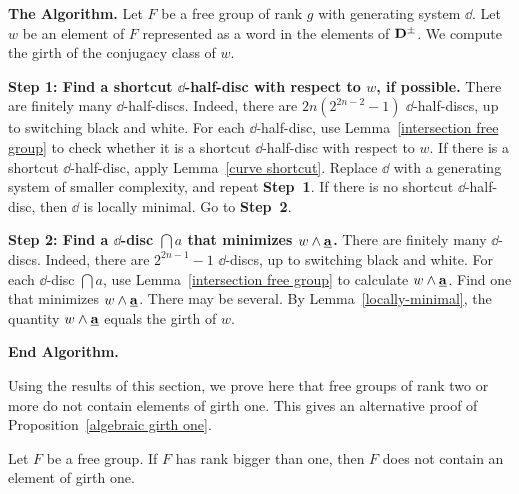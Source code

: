 \textbf{The Algorithm.}  Let $F$ be a free group of rank $g$ with generating system $\dd$.  Let $w$ be an element of $F$ represented as a word in the elements of $\mathbf{D}^\pm$.  We compute the girth of the conjugacy class of $w$.

\textbf{Step 1:  Find a shortcut $\dd$-half-disc with respect to $w$, if possible.}  There are finitely many $\dd$-half-discs.  Indeed, there are $2n(2^{2n-2}-1)$ $\dd$-half-discs, up to switching black and white.  For each $\dd$-half-disc, use Lemma~\ref{intersection free group} to check whether it is a shortcut $\dd$-half-disc with respect to $w$.  If there is a shortcut $\dd$-half-disc, apply Lemma~\ref{curve shortcut}.  Replace $\dd$ with a generating system of smaller complexity, and repeat \textbf{Step~1}.  If there is no shortcut $\dd$-half-disc, then $\dd$ is locally minimal.  Go to \textbf{Step~2}.

\textbf{Step 2:  Find a $\dd$-disc $\dint{a}$ that minimizes $w\wedge\mathbf{\underline{a}}$.}
There are finitely many $\dd$-discs.  Indeed, there are $2^{2n-1}-1$ $\dd$-discs, up to switching black and white.  For each $\dd$-disc $\dint{a}$, use Lemma~\ref{intersection free group} to calculate $w\wedge\mathbf{\underline{a}}$.  Find one that minimizes $w\wedge\mathbf{\underline{a}}$.  There may be several.  By Lemma~\ref{locally-minimal}, the quantity $w\wedge\mathbf{\underline{a}}$ equals the girth of $w$.

\textbf{End Algorithm.}

Using the results of this section, we prove here that free groups of rank two or more do not contain elements of girth one.  This gives an alternative proof of Proposition~\ref{algebraic girth one}.

\begin{lemma}
\label{group girth one}
Let $F$ be a free group.  If $F$ has rank bigger than one, then $F$ does not contain an element of girth one.
\end{lemma}

